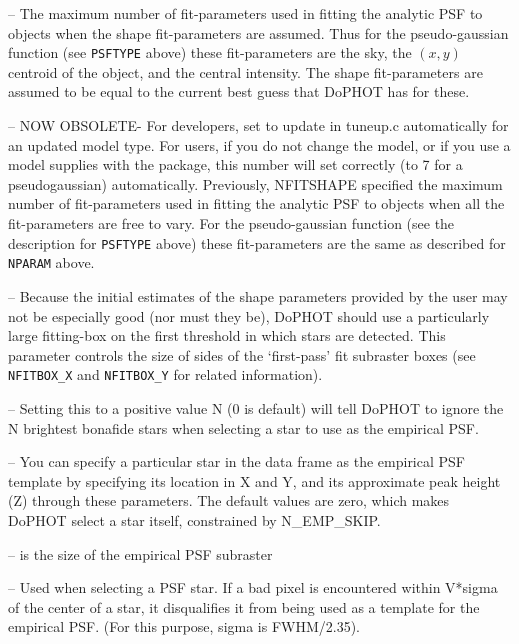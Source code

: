  -- The maximum number of fit-parameters used
in fitting the analytic PSF to objects when the shape fit-parameters
are assumed.  Thus for the pseudo-gaussian function (see
{\tt PSFTYPE} above) these fit-parameters are the sky, the $(x,y)$ centroid
of the object, and the central intensity.  The shape fit-parameters 
are assumed to be equal to the current best guess that DoPHOT has
for these.

 -- NOW OBSOLETE- For developers, set to update 
in tuneup.c automatically for an updated model type.  For users, if you do 
not change the model, or if you use a model supplies with the package, this 
number will set correctly (to 7 for a pseudogaussian) automatically. 
Previously, NFITSHAPE specified the maximum number of fit-parameters used
in fitting the analytic PSF to objects when all the fit-parameters are
free to vary.  For the pseudo-gaussian function (see the description
for {\tt PSFTYPE} above) these fit-parameters are the same as 
described for {\tt NPARAM} above.

 --  Because the initial estimates
of the shape parameters provided by the user may not be especially good
(nor must they be), DoPHOT
should use a particularly large fitting-box on the first threshold in which stars are
detected.  This parameter controls the size of sides of the `first-pass' 
fit subraster boxes (see {\tt NFITBOX\_X} and {\tt NFITBOX\_Y} for 
related information).

 -- Setting this to a positive value N 
(0 is default) will tell DoPHOT to ignore the N brightest bonafide 
stars when selecting a star to use as the empirical PSF.

 -- You can specify 
a particular star in the data frame as the empirical PSF template
by specifying its location in X and Y, and its approximate peak height
(Z) through these parameters. The default values are zero, which 
makes DoPHOT select a star itself, constrained by N\_EMP\_SKIP.

 -- is the size of the empirical PSF subraster

 -- Used when selecting a PSF star. If a
bad pixel is encountered within V*sigma of the center of a star, it 
disqualifies it from being used as a template for the empirical PSF.
(For this purpose, sigma is FWHM/2.35).

